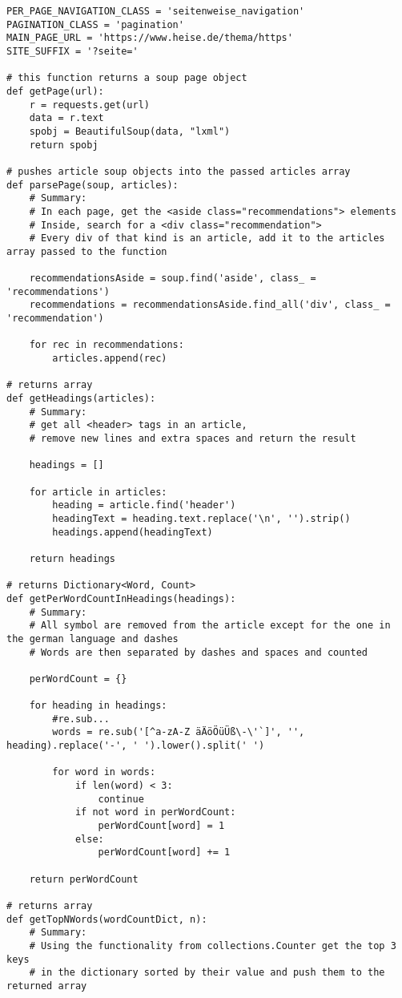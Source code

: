\begin{enumerate}
\begin{lstlisting}[style=py]
PER_PAGE_NAVIGATION_CLASS = 'seitenweise_navigation'
PAGINATION_CLASS = 'pagination'
MAIN_PAGE_URL = 'https://www.heise.de/thema/https'
SITE_SUFFIX = '?seite='

# this function returns a soup page object
def getPage(url):
    r = requests.get(url)
    data = r.text
    spobj = BeautifulSoup(data, "lxml")
    return spobj

# pushes article soup objects into the passed articles array
def parsePage(soup, articles):
    # Summary:
    # In each page, get the <aside class="recommendations"> elements
    # Inside, search for a <div class="recommendation">
    # Every div of that kind is an article, add it to the articles array passed to the function

    recommendationsAside = soup.find('aside', class_ = 'recommendations')
    recommendations = recommendationsAside.find_all('div', class_ = 'recommendation')

    for rec in recommendations:
        articles.append(rec)

# returns array
def getHeadings(articles):
    # Summary:
    # get all <header> tags in an article, 
    # remove new lines and extra spaces and return the result

    headings = []

    for article in articles:
        heading = article.find('header')
        headingText = heading.text.replace('\n', '').strip()
        headings.append(headingText)
    
    return headings

# returns Dictionary<Word, Count>
def getPerWordCountInHeadings(headings):
    # Summary:
    # All symbol are removed from the article except for the one in the german language and dashes
    # Words are then separated by dashes and spaces and counted

    perWordCount = {}

    for heading in headings:
        #re.sub...
        words = re.sub('[^a-zA-Z äÄöÖüÜß\-\'`]', '', heading).replace('-', ' ').lower().split(' ')
        
        for word in words:
            if len(word) < 3:
                continue
            if not word in perWordCount:
                perWordCount[word] = 1
            else:
                perWordCount[word] += 1

    return perWordCount

# returns array
def getTopNWords(wordCountDict, n):
    # Summary:
    # Using the functionality from collections.Counter get the top 3 keys 
    # in the dictionary sorted by their value and push them to the returned array


\end{lstlisting}
\end{enumerate}

